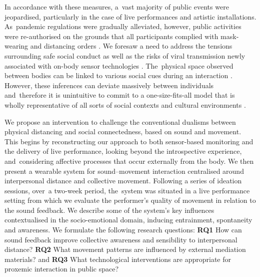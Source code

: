 In accordance with these measures, a~vast majority of public events were jeopardised, particularly in the case of live performances and artistic installations. As~pandemic regulations were gradually alleviated, however, public activities were re-authorised on the grounds that all participants complied with mask-wearing and distancing orders \citep{direcao-geral_da_saude_dgs_covid-19_2020}. We foresaw a need to address the tensions surrounding safe social conduct as well as the risks of viral transmission newly associated with on-body sensor technologies \citep{seshadri_wearable_2020,jeong_continuous_2020}. The~physical space observed between bodies can be linked to various social cues during an interaction \citep{kroczek_interpersonal_2020,vinciarelli_towards_2011,sundstrom_interpersonal_1976}. However, these inferences can deviate massively between individuals and~therefore it is unintuitive to commit to a one-size-fits-all model that is wholly representative of all sorts of social contexts and cultural environments \citep{yu_investigation_2020,sorokowska_preferred_2017}.

We propose an intervention to challenge the conventional dualisms between physical distancing and social connectedness, based on sound and movement. This begins by reconstructing our approach to both sensor-based monitoring and the delivery of live performance, looking beyond the introspective experience, and~considering affective processes that occur externally from the body. We then present a wearable system for sound--movement interaction centralised around interpersonal distance and collective movement. Following a series of ideation sessions, over~a two-week period, the~system was situated in a live performance setting from which we evaluate the performer's quality of movement in relation to the sound feedback. We describe some of the system’s key influences contextualised in the socio-emotional domain, inducing entrainment, spontaneity and awareness. We formulate the following research questions: \textbf{RQ1} How can sound feedback improve collective awareness and sensibility to interpersonal distance? \textbf{RQ2} What movement patterns are influenced by external mediation materials? and \textbf{RQ3} What technological interventions are appropriate for proxemic interaction in public space?


